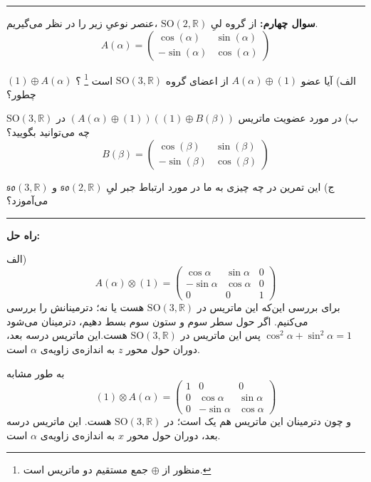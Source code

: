 \documentclass[a4paper, 12pt]{article}
\newenvironment{parind}{%
	\par%
	\medskip
	\leftskip=0mm\rightskip=7mm
	\noindent\ignorespaces}{%
	\par\medskip}
\begin{document}
\par\noindent\rule{\textwidth}{2pt}

\vspace{0.8em}
\textbf{سوال چهارم:}
از گروه لیِ 
$\text{SO}(2,\mathbb{R})$
،عنصر نوعیِ زیر را در نظر می‌گیریم.
\[
A(\alpha) = \begin{pmatrix}
	\cos(\alpha) & \sin (\alpha) \\
	-\sin (\alpha) & \cos(\alpha)
\end{pmatrix}
\]
\begin{parind}
	الف) آیا عضو
	$A(\alpha) \oplus (1)$
	از اعضای گروه 
	$\text{SO}(3,\mathbb{R})$
	است
	\footnote{منظور از 
	$\oplus$
	جمع مستقیم دو ماتریس است.}
	؟
$ (1) \oplus A (\alpha)  $
چطور؟

ب) در مورد عضویت ماتریس
$(A(\alpha) \oplus (1)) ((1) \oplus B(\beta))$ 
در
$\text{SO}(3,\mathbb{R})$
چه می‌توانید بگویید؟
\[
B(\beta) = \begin{pmatrix}
	\cos(\beta) & \sin(\beta) \\
	-\sin(\beta) & \cos(\beta)
\end{pmatrix}
\]

 ج) این تمرین در چه چیزی به ما در مورد ارتباط جبر لیِ 
 $\mathfrak{so}(2,\mathbb{R})$
 و 
 $\mathfrak{so}(3,\mathbb{R})$
 می‌آموزد؟

\end{parind}


\vspace{1.5em}
\par\noindent\rule{\textwidth}{0.6pt}
\textbf{راه حل:}

الف)
\[
A(\alpha)\otimes (1) = \begin{pmatrix}
	\cos\alpha & \sin\alpha & 0 \\ -\sin\alpha & \cos\alpha & 0 \\ 0 & 0 & 1
\end{pmatrix}
\]
برای بررسی این‌که این ماتریس در 
$\text{SO}(3,\mathbb{R})$
هست یا نه؛ دترمینانش را بررسی می‌کنیم. اگر حول سطر سوم و ستون سوم بسط دهیم، دترمینان می‌شود 
$\cos^2\alpha + \sin^2\alpha = 1$
پس این ماتریس در 
$\text{SO}(3,\mathbb{R})$
هست.این ماتریس درسه بعد، دوران حول محور $z$ به اندازه‌ی زاویه‌ی 
 $\alpha$
 است. 
 
به طور مشابه 
\[
 (1) \otimes A(\alpha) = \begin{pmatrix}
	1  & 0 & 0 \\0 & \cos\alpha  & \sin\alpha \\ 0 &  -\sin\alpha & \cos\alpha
\end{pmatrix}
\]
و چون دترمینان این ماتریس هم یک است؛ در 
$\text{SO}(3,\mathbb{R})$
هست.
این ماتریس درسه بعد، دوران حول محور $x$ به اندازه‌ی زاویه‌ی 
$\alpha$
است.
\end{document}
